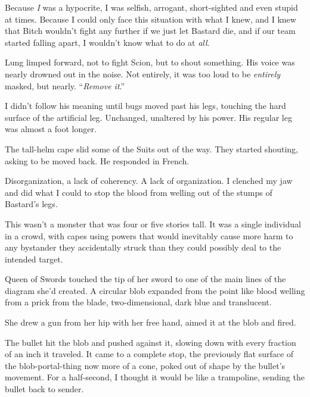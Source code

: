 Because \emph{I} was a hypocrite, I was selfish, arrogant, short-sighted and even stupid at times.  Because I could only face this situation with what I knew, and I knew that Bitch wouldn't fight any further if we just let Bastard die, and if our team started falling apart, I wouldn't know what to do at \emph{all}.



Lung limped forward, not to fight Scion, but to shout something.  His voice was nearly drowned out in the noise.  Not entirely, it was too loud to be \emph{entirely} masked, but nearly. ``\emph{Remove it}.''



I didn't follow his meaning until bugs moved past his legs, touching the hard surface of the artificial leg.  Unchanged, unaltered by his power.  His regular leg was almost a foot longer.



The tall-helm cape slid some of the Suits out of the way.  They started shouting, asking to be moved back.  He responded in French.



Disorganization, a lack of coherency.  A lack of organization.  I clenched my jaw and did what I could to stop the blood from welling out of the stumps of Bastard's legs.



This wasn't a monster that was four or five stories tall.  It was a single individual in a crowd, with capes using powers that would inevitably cause more harm to any bystander they accidentally struck than they could possibly deal to the intended target.



Queen of Swords touched the tip of her sword to one of the main lines of the diagram she'd created.  A circular blob expanded from the point like blood welling from a prick from the blade, two-dimensional, dark blue and translucent.



She drew a gun from her hip with her free hand, aimed it at the blob and fired.



The bullet hit the blob and pushed against it, slowing down with every fraction of an inch it traveled.  It came to a complete stop, the previously flat surface of the blob-portal-thing now more of a cone, poked out of shape by the bullet's movement.  For a half-second, I thought it would be like a trampoline, sending the bullet back to sender.



